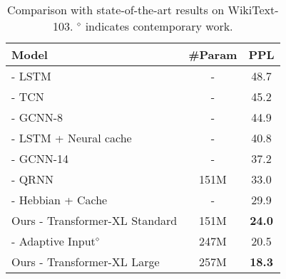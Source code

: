 \bgroup
\setlength{\tabcolsep}{3pt}
\begin{table}[t]
	\small
	\centering
	
	\begin{adjustwidth}{-4pt}{}
	\begin{tabular}{l|cc}
		\toprule
		\bf Model & \bf \#Param &  \bf PPL \\
		\midrule
		\citet{grave2016improving} - LSTM & - & 48.7 \\
		\citet{bai2018empirical} - TCN & - & 45.2 \\
		\citet{dauphin2016language} - GCNN-8 & - & 44.9 \\
		\citet{grave2016improving} - LSTM + Neural cache & - & 40.8 \\
		\citet{dauphin2016language} - GCNN-14 & - & 37.2 \\
		\citet{merity2018analysis} - QRNN & 151M & 33.0 \\
		\citet{rae2018fast} - Hebbian + Cache & - & 29.9 \\
		Ours - Transformer-XL Standard & 151M & \textbf{24.0} \\
		\midrule
		\citet{baevski2018adaptive} - Adaptive Input$^\diamond$ & 247M & 20.5 \\
		Ours - Transformer-XL Large & 257M & \textbf{18.3} \\
		\bottomrule
	\end{tabular}
	\caption{\small
		Comparison with state-of-the-art results on WikiText-103. $^\diamond$ indicates contemporary work.
	}
	\label{table:103}
	\end{adjustwidth}
\end{table}
\egroup


